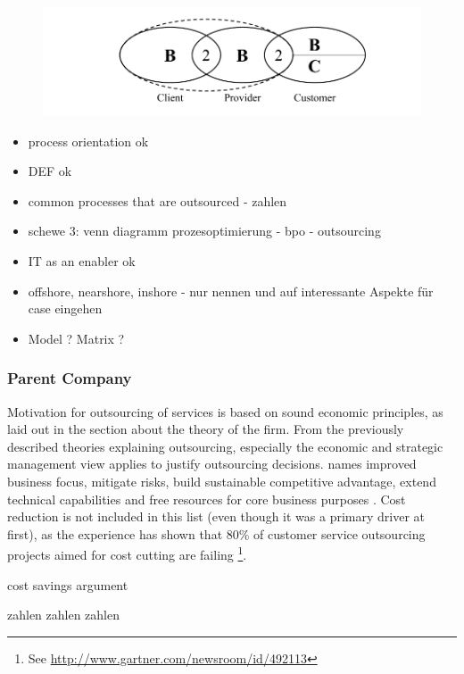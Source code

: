 		\begin{figure}[caption={BPO B2B2B/C Chain}, label={fig:bpochain}]
	{	\includegraphics[width=.8\textwidth]{figures/bpochain.pdf}}
	\end{figure}

			
		\begin{itemize}
			\item process orientation  ok
			\item DEF ok 
			\item common processes that are outsourced - zahlen
			\item schewe 3: venn diagramm prozesoptimierung - bpo - outsourcing
			
			\item IT as an enabler ok 
			\item offshore, nearshore, inshore - nur nennen und auf interessante Aspekte für case eingehen
			\item Model ? Matrix ? 
		\end{itemize}
	
		\subsubsection{Parent Company}
		Motivation for outsourcing of services is based on sound economic principles, as laid out in the section about the theory of the firm. From the previously described theories explaining outsourcing, especially the economic and strategic management view applies to justify outsourcing decisions. \citeauthor{bartell1998information} names improved business focus, mitigate risks, build sustainable competitive advantage, extend technical capabilities and free resources for core business purposes \cite{bartell1998information}. Cost reduction is not included in this list (even though it was a primary driver at first), as the experience has shown that 80\% of customer service outsourcing projects aimed for cost cutting are failing \footnote{See \url{http://www.gartner.com/newsroom/id/492113}}. 
		
		cost savings argument
		
		zahlen zahlen zahlen
		
